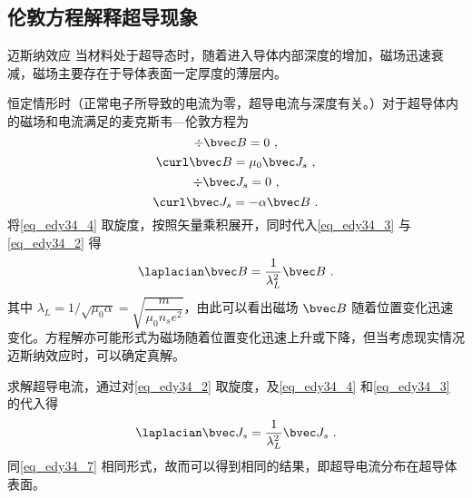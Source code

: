 \subsection{伦敦方程解释超导现象}
\begin{theorem}{迈斯纳效应}
当材料处于超导态时，随着进入导体内部深度的增加，磁场迅速衰减，磁场主要存在于导体表面一定厚度的薄层内。
\end{theorem}
恒定情形时（正常电子所导致的电流为零，超导电流与深度有关。）对于超导体内的磁场和电流满足的麦克斯韦—伦敦方程为
\begin{equation}
\div \bvec B=0\label{eq_edy34_3}~,
\end{equation}
\begin{equation}
\curl \bvec B=\mu_0 \bvec J_s\label{eq_edy34_4}~,
\end{equation}
\begin{equation}
\div \bvec J_s=0\label{eq_edy34_5}~,
\end{equation}
\begin{equation}
\curl \bvec J_s=-\alpha\bvec B~.
\end{equation}
将\autoref{eq_edy34_4} 取旋度，按照矢量乘积展开，同时代入\autoref{eq_edy34_3} 与\autoref{eq_edy34_2} 得
\begin{equation}
\laplacian \bvec B=\dfrac{1}{\lambda_L^2}\bvec B \label{eq_edy34_7}~.
\end{equation}
其中 $\lambda_L= 1/\sqrt{\mu_0\alpha}=\sqrt{\dfrac m {\mu_0n_se^2}}$，由此可以看出磁场 $\bvec B$ 随着位置变化迅速变化。方程解亦可能形式为磁场随着位置变化迅速上升或下降，但当考虑现实情况迈斯纳效应时，可以确定真解。

求解超导电流，通过对\autoref{eq_edy34_2} 取旋度，及\autoref{eq_edy34_4} 和\autoref{eq_edy34_3} 的代入得
\begin{equation}
\laplacian\bvec J_s=\dfrac 1 {\lambda_L^2}\bvec J_s~.
\end{equation}
同\autoref{eq_edy34_7} 相同形式，故而可以得到相同的结果，即超导电流分布在超导体表面。
